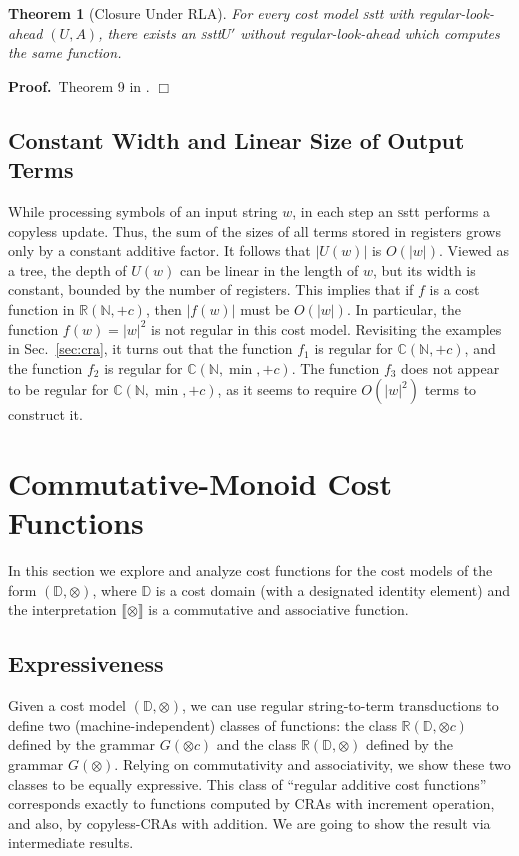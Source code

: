 \documentclass[11pt]{article}
\newtheorem{theorem}{Theorem}
\def\Proof{{\bf Proof.}}
\def\qed{{\bf $\Box$}}
\newcommand{\mypar}[1]{\subsection{#1}}
\def\qed{{\bf $\Box$}}
\newcommand{\domain}{\ensuremath{\mathbb{D}}}
\newcommand{\Nat}{\ensuremath{\mathbb{N}}}
\newcommand{\CG}{G}
\newcommand{\reg}[1]{{\mathbb R}(#1)}
\newcommand{\CostModel}{\ensuremath{\mathbb{C}}}
\newcommand{\SSTT}{{\sc\textsc sstt}\xspace}
\newcommand{\stt}{\ensuremath{U}}
\newcommand{\interp}[1]{\ensuremath{\llbracket #1\rrbracket}}
\newcommand{\secref}[1]{Sec.~\ref{sec:#1}\xspace}
\def\myplus{\otimes}
\begin{document}
\begin{theorem}[Closure Under RLA]\label{thm:stt-rla}
For every cost model \SSTT with regular-look-ahead $(\stt,A)$, there
exists an \SSTT $\stt'$ without regular-look-ahead which computes the
same function.
\end{theorem}
\Proof~Theorem 9 in \cite{alur_stt_2011}.
\qed

\mypar{Constant Width and Linear Size of Output Terms}
While processing symbols of an input string $w$, in each step an \SSTT
performs a copyless update. Thus, the sum of the sizes of all terms
stored in registers grows only by a constant additive factor.  It
follows that $|\stt(w)|$ is $O(|w|)$.  Viewed as a tree, the depth of
$\stt(w)$ can be linear in the length of $w$, but its width is
constant, bounded by the number of registers.  This implies that if
$f$ is a cost function in $\reg{\Nat,+c}$, then $|f(w)|$ must be
$O(|w|)$. In particular, the function $f(w)=|w|^2$ is not regular in
this cost model.  Revisiting the examples in \secref{cra}, it turns
out that the function $f_1$ is regular for $\CostModel(\Nat,+c)$, and
the function $f_2$ is regular for $\CostModel(\Nat,\min,+c)$.  The
function $f_3$ does not appear to be
regular for $\CostModel(\Nat,\min,+c)$, as it seems to require
$O(|w|^2)$ terms to construct it.

\section{Commutative-Monoid Cost Functions}\label{sec:cmcf}
In this section we explore and analyze cost functions for the cost
models of the form $(\domain,\myplus)$, where $\domain$ is a cost
domain (with a designated identity element) and the interpretation
$\interp{\myplus}$ is a commutative and associative function.


\mypar{Expressiveness}
Given a cost model $(\domain,\myplus)$, we can use regular
string-to-term transductions to define two (machine-independent)
classes of functions: the class $\reg{\domain,\myplus c}$ defined by
the grammar $\CG(\myplus c)$ and the class $\reg{\domain,\myplus}$
defined by the grammar $\CG(\myplus)$.  Relying on commutativity and
associativity, we show these two classes to be equally expressive.
This class of ``regular additive cost functions'' corresponds exactly
to functions computed by CRAs with increment operation, and also, by
copyless-CRAs with addition.  We are going to show the result via
intermediate results.
\end{document}
